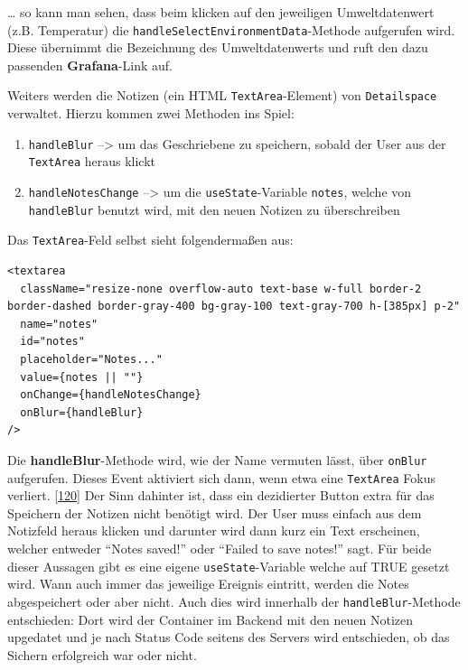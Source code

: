 \documentclass[
    headings=optiontotocandhead,%
    twoside,
    numbers=noenddot,%
    12pt, %
    titlepage, %
    parskip=full, %
    listof=leveldown, 
    numbers=noenddot, %
    a4paper,DIV=14,
    BCOR=15mm,
]{scrbook}
\newcommand{\passthrough}[1]{#1}
\providecommand{\tightlist}{%
  \setlength{\itemsep}{0pt}\setlength{\parskip}{0pt}}
\begin{document}
\ldots{} so kann man sehen, dass beim klicken auf den jeweiligen
Umweltdatenwert (z.B. Temperatur) die
\passthrough{\lstinline!handleSelectEnvironmentData!}-Methode aufgerufen
wird. Diese übernimmt die Bezeichnung des Umweltdatenwerts und ruft den
dazu passenden \textbf{Grafana}-Link auf.

Weiters werden die Notizen (ein HTML
\passthrough{\lstinline!TextArea!}-Element) von
\passthrough{\lstinline!Detailspace!} verwaltet. Hierzu kommen zwei
Methoden ins Spiel:

\begin{enumerate}
\def\labelenumi{\arabic{enumi}.}
\tightlist
\item
  \passthrough{\lstinline!handleBlur!} --\textgreater{} um das
  Geschriebene zu speichern, sobald der User aus der
  \passthrough{\lstinline!TextArea!} heraus klickt
\item
  \passthrough{\lstinline!handleNotesChange!} --\textgreater{} um die
  \passthrough{\lstinline!useState!}-Variable
  \passthrough{\lstinline!notes!}, welche von
  \passthrough{\lstinline!handleBlur!} benutzt wird, mit den neuen
  Notizen zu überschreiben
\end{enumerate}

Das \passthrough{\lstinline!TextArea!}-Feld selbst sieht folgendermaßen
aus:

\begin{lstlisting}[caption={TextArea Tag des Notiz-Felds}]
<textarea
  className="resize-none overflow-auto text-base w-full border-2 border-dashed border-gray-400 bg-gray-100 text-gray-700 h-[385px] p-2"
  name="notes"
  id="notes"
  placeholder="Notes..."
  value={notes || ""}
  onChange={handleNotesChange}
  onBlur={handleBlur}
/>
\end{lstlisting}

Die \textbf{handleBlur}-Methode wird, wie der Name vermuten lässt, über
\passthrough{\lstinline!onBlur!} aufgerufen. Dieses Event aktiviert sich
dann, wenn etwa eine \passthrough{\lstinline!TextArea!} Fokus verliert.
{[}\protect\hyperlink{ref-GeeksForGeeks-onBlur}{120}{]} Der Sinn
dahinter ist, dass ein dezidierter Button extra für das Speichern der
Notizen nicht benötigt wird. Der User muss einfach aus dem Notizfeld
heraus klicken und darunter wird dann kurz ein Text erscheinen, welcher
entweder ``Notes saved!'' oder ``Failed to save notes!'' sagt. Für beide
dieser Aussagen gibt es eine eigene
\passthrough{\lstinline!useState!}-Variable welche auf TRUE gesetzt
wird. Wann auch immer das jeweilige Ereignis eintritt, werden die Notes
abgespeichert oder aber nicht. Auch dies wird innerhalb der
\passthrough{\lstinline!handleBlur!}-Methode entschieden: Dort wird der
Container im Backend mit den neuen Notizen upgedatet und je nach Status
Code seitens des Servers wird entschieden, ob das Sichern erfolgreich
war oder nicht.
\end{document}
